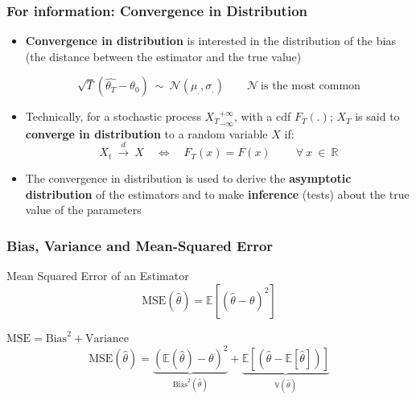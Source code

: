 \documentclass{beamer}
\begin{document}
  
  \begin{frame}
    \frametitle{For information: Convergence in Distribution}

    \begin{itemize}
\item  \textbf{Convergence in distribution} is interested in the distribution of the bias (the distance between the estimator and the true value)

  \begin{equation*}
    \sqrt{T} \left(\hat{\theta_T} - \theta_0 \right) \ \sim \ \mathcal{N}(\mu_., \sigma_.) \qquad \mathcal{N} \ \text{is the most common} 
  \end{equation*}

\item Technically, for a stochastic process ${X_T}_{-\infty}^ {+\infty}$, with a cdf $F_T(.)$; $X_T$ is said to \textbf{converge in distribution} to a random variable $X$ if:
  \begin{equation*}
X_t \ \overset{d}{\to} \ X \quad \Leftrightarrow \quad  F_T(x) = F(x) \qquad \ \forall \ x \ \in \ \mathbb{R}
  \end{equation*}
    
\item The convergence in distribution is used to derive the \textbf{asymptotic distribution} of the estimators and to make \textbf{inference} (tests) about the true value of the parameters

    \end{itemize}    
  \end{frame}


  \begin{frame}
    \frametitle{Bias, Variance and Mean-Squared Error}

    \begin{block}{Mean Squared Error of an Estimator}
      \begin{equation*}
        \text{MSE}(\hat{\theta}) = \mathbb{E}\left[ (\hat{\theta} - \theta)^2 \right]
      \end{equation*}
    \end{block}


    \begin{alertblock}{$\text{MSE} = \text{Bias}^2 + \text{Variance}$}
      \begin{equation*}
       \text{MSE}(\hat{\theta}) = \underbrace{\left(\mathbb{E}(\hat{\theta}) -\theta \right)^2}_{\text{Bias}^2(\hat{\theta})} + \underbrace{\mathbb{E}\left[(\hat{\theta} - \mathbb{E}[\hat{\theta}]) \right]}_{\mathbb{V}(\hat{\theta})}
      \end{equation*}
    \end{alertblock}
    
  \end{frame}
\end{document}
